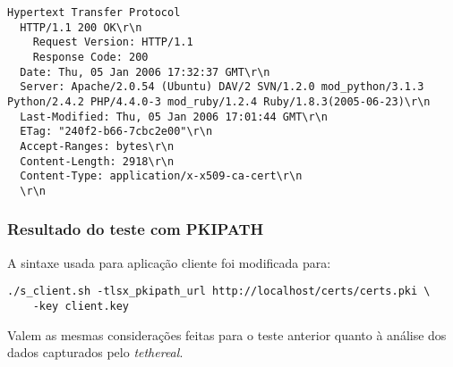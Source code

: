 \begin{lstlisting}[caption={Início (cabeçalho) da resposta HTTP enviada pelo servidor para a aplicação \texttt{s\_server}}]
Hypertext Transfer Protocol
  HTTP/1.1 200 OK\r\n
    Request Version: HTTP/1.1
    Response Code: 200
  Date: Thu, 05 Jan 2006 17:32:37 GMT\r\n
  Server: Apache/2.0.54 (Ubuntu) DAV/2 SVN/1.2.0 mod_python/3.1.3 Python/2.4.2 PHP/4.4.0-3 mod_ruby/1.2.4 Ruby/1.8.3(2005-06-23)\r\n
  Last-Modified: Thu, 05 Jan 2006 17:01:44 GMT\r\n
  ETag: "240f2-b66-7cbc2e00"\r\n
  Accept-Ranges: bytes\r\n
  Content-Length: 2918\r\n
  Content-Type: application/x-x509-ca-cert\r\n
  \r\n
\end{lstlisting}

\subsubsection{Resultado do teste com PKIPATH}

A sintaxe usada para aplicação cliente foi modificada para:

\begin{lstlisting}
./s_client.sh -tlsx_pkipath_url http://localhost/certs/certs.pki \
    -key client.key
\end{lstlisting}

Valem as mesmas considerações feitas para o teste anterior quanto à análise dos
dados capturados pelo \emph{tethereal}.


